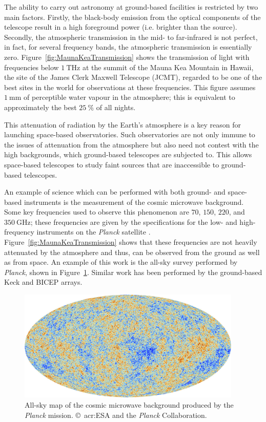 \par
The ability to carry out astronomy at ground-based facilities is restricted by two main factors. Firstly, the black-body emission from the optical components of the telescope result in a high foreground power (i.e. brighter than the source). Secondly, the atmospheric transmission in the mid- to far-infrared is not perfect, in fact, for several frequency bands, the atmospheric transmission is essentially zero. Figure~\ref{fig:MaunaKeaTransmission} shows the transmission of light with frequencies below $1~\mathrm{THz}$ at the summit of the Mauna Kea Mountain in Hawaii, the site of the James Clerk Maxwell Telescope (JCMT), regarded to be one of the best sites in the world for observations at these frequencies. This figure assumes $1~\mathrm{mm}$ of perceptible water vapour in the atmosphere; this is equivalent to approximately the best $25~\%$ of all nights. 
\par 
This attenuation of radiation by the Earth's atmosphere is a key reason for launching space-based observatories. Such observatories are not only immune to the issues of attenuation from the atmosphere but also need not contest with the high backgrounds, which ground-based telescopes are subjected to. This allows space-based telescopes to study faint sources that are inaccessible to ground-based telescopes. 
\par 
An example of science which can be performed with both ground- and space-based instruments is the measurement of the cosmic microwave background. Some key frequencies used to observe this phenomenon are $70$, $150$, $220$, and $350~\mathrm{GHz}$; these frequencies are given by the specifications for the low- and high-frequency instruments on the \textit{Planck} satellite \parencite{Valenziano2007,Lamarre2003}. Figure~\ref{fig:MaunaKeaTransmission} shows that these frequencies are not heavily attenuated by the atmosphere and thus, can be observed from the ground as well as from space. An example of this work is the all-sky survey performed by \textit{Planck}, shown in Figure~\ref{fig:Planck_CMB}. Similar work has been performed by the ground-based Keck and BICEP arrays.
\begin{figure}[tb]
\begin{center}
\includegraphics[width = 0.95\textwidth]{figures/Planck_CMB}
\caption[All-sky map of the cosmic microwave background produced by the \textit{Planck} mission]{All-sky map of the cosmic microwave background produced by the \textit{Planck} mission. \copyright~\gls{acr:ESA} and the \textit{Planck} Collaboration.}
\label{fig:Planck_CMB}
\end{center}
\end{figure}
